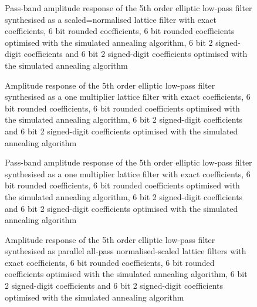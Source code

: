 \documentclass[a4paper,twoside,10pt,english]{report}
\begin{document}
\begin{figure}[!htbp]
\begin{center}
\scalebox{0.7}{}
\caption{Pass-band amplitude response of the 5th order elliptic low-pass
filter synthesised as a scaled=normalised lattice filter with exact
coefficients, 6 bit rounded coefficients, 6 bit rounded coefficients
optimised with the simulated annealing algorithm, 6 bit 2 signed-digit 
coefficients and 6 bit 2 signed-digit coefficients optimised with the
simulated annealing algorithm}
\label{fig:samin_NS_lattice_passband_response}
\end{center}
\end{figure}
\begin{figure}[!htbp]
\begin{center}
\scalebox{0.7}{}
\caption{Amplitude response of the 5th order elliptic low-pass
filter synthesised as a one multiplier lattice filter with exact 
coefficients, 6 bit rounded coefficients, 6 bit rounded coefficients
optimised with the simulated annealing algorithm, 6 bit 2 signed-digit
coefficients and 6 bit 2 signed-digit coefficients optimised with the 
simulated annealing algorithm}
\label{fig:samin_OneM_lattice_response}
\end{center}
\end{figure}
\begin{figure}[!htbp]
\begin{center}
\scalebox{0.7}{}
\caption{Pass-band amplitude response of the 5th order elliptic low-pass
filter synthesised as a one multiplier lattice filter with exact 
coefficients, 6 bit rounded coefficients, 6 bit rounded coefficients
optimised with the simulated annealing algorithm, 6 bit 2 signed-digit 
coefficients and 6 bit 2 signed-digit coefficients optimised with the 
simulated annealing algorithm}
\label{fig:samin_OneM_lattice_passband_response}
\end{center}
\end{figure}
\begin{figure}[!htbp]
\begin{center}
\scalebox{0.7}{}
\caption{Amplitude response of the 5th order elliptic low-pass filter 
synthesised as parallel all-pass normalised-scaled lattice filters with exact
coefficients, 6 bit rounded coefficients, 6 bit rounded coefficients
optimised with the simulated annealing algorithm, 6 bit 2 signed-digit
coefficients and 6 bit 2 signed-digit coefficients optimised with the 
simulated annealing algorithm}
\label{fig:samin_NSPA_lattice_response}
\end{center}
\end{figure}
\end{document}
